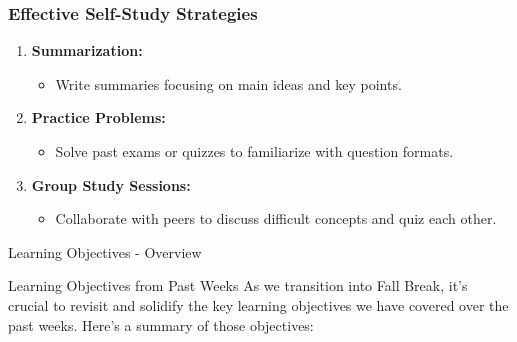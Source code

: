 \documentclass[aspectratio=169]{beamer}
\begin{document}
\begin{frame}[fragile]
    \frametitle{Effective Self-Study Strategies}
    \begin{enumerate}
        \item \textbf{Summarization:} 
        \begin{itemize}
            \item Write summaries focusing on main ideas and key points.
        \end{itemize}
        
        \item \textbf{Practice Problems:}
        \begin{itemize}
            \item Solve past exams or quizzes to familiarize with question formats.
        \end{itemize}
        
        \item \textbf{Group Study Sessions:}
        \begin{itemize}
            \item Collaborate with peers to discuss difficult concepts and quiz each other.
        \end{itemize}
    \end{enumerate}
\end{frame}

\begin{frame}[fragile]{Learning Objectives - Overview}
    \begin{block}{Learning Objectives from Past Weeks}
        As we transition into Fall Break, it's crucial to revisit and solidify the key learning objectives we have covered over the past weeks. Here’s a summary of those objectives:
    \end{block}
\end{frame}
\end{document}

